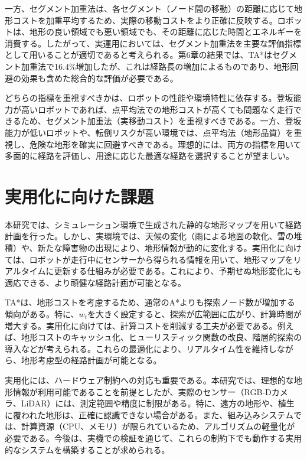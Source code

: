 一方、セグメント加重法は、各セグメント（ノード間の移動）の距離に応じて地形コストを加重平均するため、実際の移動コストをより正確に反映する。ロボットは、地形の良い領域でも悪い領域でも、その距離に応じた時間とエネルギーを消費する。したがって、実運用においては、セグメント加重法を主要な評価指標として用いることが適切であると考えられる。第6章の結果では、TA*はセグメント加重法で16.4\%増加したが、これは経路長の増加によるものであり、地形回避の効果も含めた総合的な評価が必要である。

どちらの指標を重視すべきかは、ロボットの性能や環境特性に依存する。登坂能力が高いロボットであれば、点平均法での地形コストが高くても問題なく走行できるため、セグメント加重法（実移動コスト）を重視すべきである。一方、登坂能力が低いロボットや、転倒リスクが高い環境では、点平均法（地形品質）を重視し、危険な地形を確実に回避すべきである。理想的には、両方の指標を用いて多面的に経路を評価し、用途に応じた最適な経路を選択することが望ましい。

\section{実用化に向けた課題}

本研究では、シミュレーション環境で生成された静的な地形マップを用いて経路計画を行った。しかし、実環境では、天候の変化（雨による地面の軟化、雪の堆積）や、新たな障害物の出現により、地形情報が動的に変化する。実用化に向けては、ロボットが走行中にセンサーから得られる情報を用いて、地形マップをリアルタイムに更新する仕組みが必要である。これにより、予期せぬ地形変化にも適応できる、より頑健な経路計画が可能となる。

TA*は、地形コストを考慮するため、通常のA*よりも探索ノード数が増加する傾向がある。特に、$w_t$を大きく設定すると、探索が広範囲に広がり、計算時間が増大する。実用化に向けては、計算コストを削減する工夫が必要である。例えば、地形コストのキャッシュ化、ヒューリスティック関数の改良、階層的探索の導入などが考えられる。これらの最適化により、リアルタイム性を維持しながら、地形考慮型の経路計画が可能となる。

実用化には、ハードウェア制約への対応も重要である。本研究では、理想的な地形情報が利用可能であることを前提としたが、実際のセンサー（RGB-Dカメラ、LiDAR）には、測定範囲や精度に制限がある。特に、遠方の地形や、植生に覆われた地形は、正確に認識できない場合がある。また、組み込みシステムでは、計算資源（CPU、メモリ）が限られているため、アルゴリズムの軽量化が必要である。今後は、実機での検証を通じて、これらの制約下でも動作する実用的なシステムを構築することが求められる。

